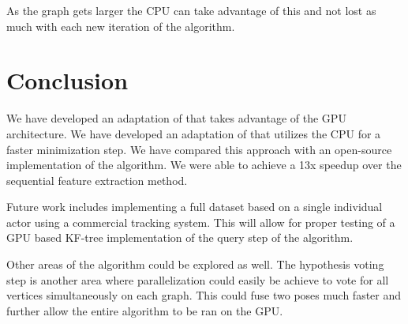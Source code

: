 \documentclass[conference]{IEEEtran}
\begin{document}
As the graph gets larger the CPU can take advantage of this and not lost as much with each new iteration of the algorithm.

\section{Conclusion}
\label{sec:clonclusion}
We have developed an adaptation of \cite{Baak2011} that takes advantage of the GPU architecture. We have developed an adaptation of \cite{Ortega-Arranz2013} that utilizes the CPU for a faster minimization step. We have compared this approach with an open-source implementation \cite{Rocha2013} of the \cite{Baak2011} algorithm. We were able to achieve a 13x speedup over the sequential feature extraction method.

Future work includes implementing a full dataset based on a single individual actor using a commercial tracking system. This will allow for proper testing of a GPU based KF-tree implementation of the query step of the algorithm.

Other areas of the algorithm could be explored as well. The hypothesis voting step is another area where parallelization could easily be achieve to vote for all vertices simultaneously on each graph. This could fuse two poses much faster and further allow the entire algorithm to be ran on the GPU.




\end{document}
